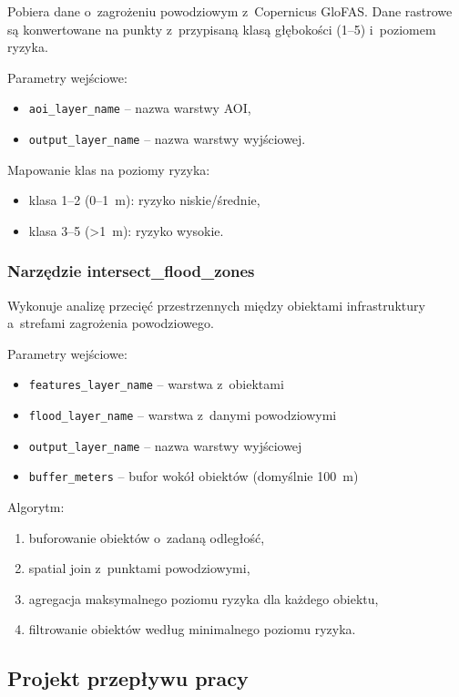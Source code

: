 Pobiera dane o~zagrożeniu powodziowym z~Copernicus GloFAS. Dane rastrowe są konwertowane na punkty z~przypisaną klasą głębokości (1--5) i~poziomem ryzyka.

Parametry wejściowe:
\begin{itemize}
    \item \texttt{aoi\_layer\_name} -- nazwa warstwy AOI,
    \item \texttt{output\_layer\_name} -- nazwa warstwy wyjściowej.
\end{itemize}

Mapowanie klas na poziomy ryzyka:
\begin{itemize}
    \item klasa 1--2 (0--1~m): ryzyko niskie/średnie,
    \item klasa 3--5 (>1~m): ryzyko wysokie.
\end{itemize}

\subsubsection{Narzędzie intersect\_flood\_zones}

Wykonuje analizę przecięć przestrzennych między obiektami infrastruktury a~strefami zagrożenia powodziowego.

Parametry wejściowe:
\begin{itemize}
    \item \texttt{features\_layer\_name} -- warstwa z~obiektami
    \item \texttt{flood\_layer\_name} -- warstwa z~danymi powodziowymi
    \item \texttt{output\_layer\_name} -- nazwa warstwy wyjściowej
    \item \texttt{buffer\_meters} -- bufor wokół obiektów (domyślnie 100~m)
\end{itemize}

Algorytm:
\begin{enumerate}
    \item buforowanie obiektów o~zadaną odległość,
    \item spatial join z~punktami powodziowymi,
    \item agregacja maksymalnego poziomu ryzyka dla każdego obiektu,
    \item filtrowanie obiektów według minimalnego poziomu ryzyka.
\end{enumerate}

\subsection{Projekt przepływu pracy}

